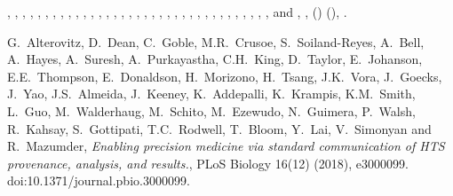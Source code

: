 \documentclass[ds,v1.1.2,openaccess]{iosart2x}%
\begin{document}
\begin{thebibliography}{}
%
\begin{barticle}
,
,
,
,
,
,
,
,
,
,
,
,
,
,
,
,
,
,
,
,
,
,
,
,
,
,
,
,
,
,
,
,
,
,
,
 and
,
,
()
(),
.
\end{barticle}
%
\OrigBibText
G.~Alterovitz,
D.~Dean,
C.~Goble,
M.R.~Crusoe,
S.~Soiland-Reyes,
A.~Bell,
A.~Hayes,
A.~Suresh,
A.~Purkayastha,
C.H.~King,
D.~Taylor,
E.~Johanson,
E.E.~Thompson,
E.~Donaldson,
H.~Morizono,
H.~Tsang,
J.K.~Vora,
J.~Goecks,
J.~Yao,
J.S.~Almeida,
J.~Keeney,
K.~Addepalli,
K.~Krampis,
K.M.~Smith,
L.~Guo,
M.~Walderhaug,
M.~Schito,
M.~Ezewudo,
N.~Guimera,
P.~Walsh,
R.~Kahsay,
S.~Gottipati,
T.C.~Rodwell,
T.~Bloom,
Y.~Lai,
V.~Simonyan and
R.~Mazumder,
\textit{Enabling precision medicine via standard communication of {HTS}
provenance, analysis, and results.},
{PLoS} Biology
16(12)
(2018),
e3000099.
doi:10.1371/journal.pbio.3000099.
\endOrigBibText
{}
\endbibitem


\end{thebibliography}
\end{document}
